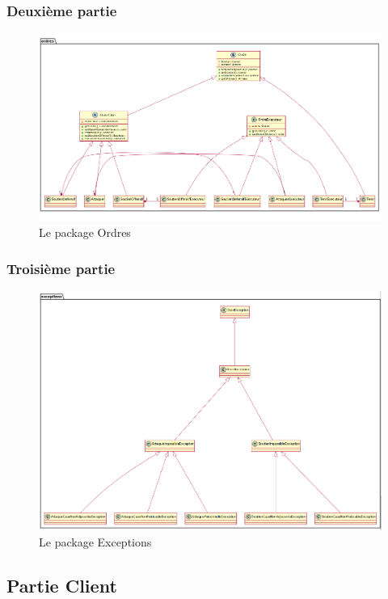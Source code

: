 		\subsubsection{Deuxième partie}
			\vspace{10mm}
			\begin{figure}[!h]
				\centering
				\includegraphics[scale=0.4]{images/DP2.png}
				\caption{Le package Ordres}
			\end{figure}

		\subsubsection{Troisième partie}
			\vspace{10mm}
			\begin{figure}[!h]
				\centering
				\includegraphics[scale=0.4]{images/DP3.png}
				\caption{Le package Exceptions}
			\end{figure}
		\newpage
	\subsection{Partie Client}
